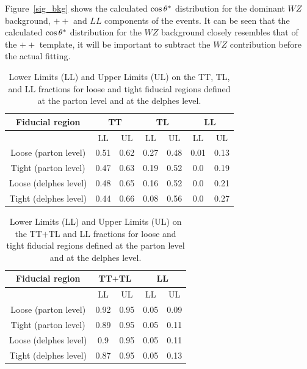 Figure~\ref{sig_bkg} shows the calculated $ \cos \theta^{*}  $ distribution for the dominant $WZ$ background, $++$ and $LL$ components of the \ssWW events. 
It can be seen that the calculated $ \cos \theta^{*}  $ distribution for the $WZ$ background closely resembles that of the $++$ template, 
it will be important to subtract the $WZ$ contribution before the actual fitting. 

\begin{table}[h!]
\begin{center}
\begin{tabular}{c |cc|cc|cc}
\hline \hline
Fiducial region & \multicolumn{2}{c|}{TT} & \multicolumn{2}{c|}{TL}  & \multicolumn{2}{c}{LL} \\
\hline
 & LL & UL & LL & UL & LL & UL  \\
\hline
Loose (parton level) & 0.51 & 0.62 &0.27 & 0.48 &0.01 & 0.13\\ 
Tight (parton level) & 0.47 & 0.63 &0.19 & 0.52 &0.0 & 0.19\\ 
Loose ({\sc delphes} level) & 0.48 & 0.65 &0.16 & 0.52 &0.0 & 0.21\\ 
Tight ({\sc delphes} level) & 0.44 & 0.66 &0.08 & 0.56 &0.0 & 0.27\\ 
\hline
\hline
\end{tabular}
\caption{\label{tab:sens} Lower Limits (LL) and Upper Limits (UL) on the TT, TL, and LL fractions for loose and tight fiducial regions defined at the parton level and at the {\sc delphes} level. }
\end{center}
\end{table}

\begin{table}[h!]
\begin{tabular}{c |cc|cc}
\hline \hline
Fiducial region & \multicolumn{2}{c|}{TT$+$TL} & \multicolumn{2}{c}{LL} \\
\hline
 & LL & UL & LL & UL  \\
\hline
Loose (parton level) & 0.92 & 0.95 &0.05 & 0.09\\ 
Tight (parton level) & 0.89 & 0.95 &0.05 & 0.11\\ 
Loose ({\sc delphes} level) & 0.9 & 0.95 &0.05 & 0.11\\ 
Tight ({\sc delphes} level) & 0.87 & 0.95 &0.05 & 0.13\\ 
\hline
\hline
\end{tabular}
\caption{\label{tab:sens2}Lower Limits (LL) and Upper Limits (UL) on the TT$+$TL and LL fractions for loose and tight fiducial regions defined at the parton level and at the {\sc delphes} level.}
\end{table}

